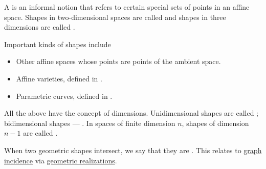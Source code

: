 \begin{remark}\label{rem:geometric_shape}
  A  is an informal notion that refers to certain special sets of points in an affine space. Shapes in two-dimensional spaces are called  and shapes in three dimensions are called .

  Important kinds of shapes include
  \begin{itemize}
    \item Other affine spaces whose points are points of the ambient space.
    \item Affine varieties, defined in .
    \item Parametric curves, defined in .
  \end{itemize}

  All the above have the concept of dimensions. Unidimensional shapes are called ; bidimensional shapes --- . In spaces of finite dimension \( n \), shapes of dimension \( n - 1 \) are called .

  When two geometric shapes intersect, we say that they are . This relates to \hyperref[def:graph_incidence]{graph incidence} via \hyperref[def:graph_geometric_realization]{geometric realizations}.
\end{remark}

